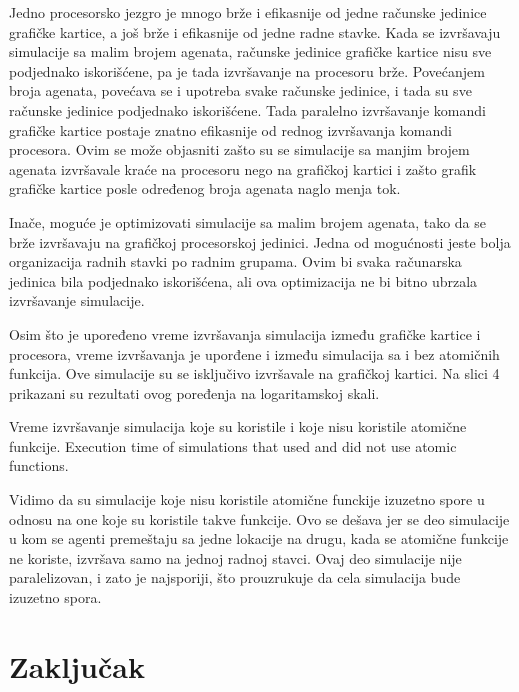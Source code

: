 Jedno procesorsko jezgro je mnogo brže i efikasnije od jedne računske jedinice
grafičke kartice, a još brže i efikasnije od jedne radne stavke. Kada se izvršavaju
simulacije sa malim brojem agenata, računske jedinice grafičke kartice nisu sve
podjednako iskorišćene, pa je tada izvršavanje na procesoru brže. Povećanjem broja
agenata, povećava se i upotreba svake računske jedinice, i tada su sve računske
jedinice podjednako iskorišćene. Tada paralelno izvršavanje komandi grafičke kartice
postaje znatno efikasnije od rednog izvršavanja komandi procesora. Ovim se može
objasniti zašto su se simulacije sa manjim brojem agenata izvršavale kraće na
procesoru nego na grafičkoj kartici i zašto grafik grafičke kartice posle određenog broja
agenata naglo menja tok.

Inače, moguće je optimizovati simulacije sa malim brojem agenata, tako da se
brže izvršavaju na grafičkoj procesorskoj jedinici. Jedna od mogućnosti jeste bolja
organizacija radnih stavki po radnim grupama. Ovim bi svaka računarska jedinica bila
podjednako iskorišćena, ali ova optimizacija ne bi bitno ubrzala izvršavanje simulacije.

Osim što je upoređeno vreme izvršavanja simulacija između grafičke kartice i
procesora, vreme izvršavanja je uporđene i između simulacija sa i bez atomičnih
funkcija. Ove simulacije su se isključivo izvršavale na grafičkoj kartici. Na slici 4
prikazani su rezultati ovog poređenja na logaritamskoj skali.

    {Vreme izvršavanje simulacija koje su koristile i koje nisu koristile atomične funkcije.}
    {Execution time of simulations that used and did not use atomic functions.}

Vidimo da su simulacije koje nisu koristile atomične funckije izuzetno spore u odnosu na
one koje su koristile takve funkcije. Ovo se dešava jer se deo simulacije u kom se
agenti premeštaju sa jedne lokacije na drugu, kada se atomične funkcije ne koriste,
izvršava samo na jednoj radnoj stavci. Ovaj deo simulacije nije paralelizovan, i zato je
najsporiji, što prouzrukuje da cela simulacija bude izuzetno spora.

\section{Zaključak}

